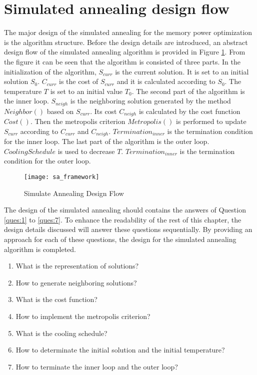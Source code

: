 	\section{Simulated annealing design flow}
	\label{sec:sa_design_flow}
	The major design of the simulated annealing for the memory power optimization is
	the algorithm structure. Before the design details are introduced, an abstract
	design flow of the simulated annealing algorithm is provided in Figure
	\ref{fig:sa_framwork}. From the figure it can be seen that the algorithm is
	consisted of three parts.
	In the initialization of the algorithm, $S_{curr}$ is
	the current solution. It is set to an initial solution $S_{0}$. $C_{curr}$ is the
	cost of $S_{curr}$ and it is calculated according to $S_{0}$. The temperature
	$T$ is set to an initial value $T_{0}$.
	The second part of the algorithm is the inner loop. $S_{neigh}$ is the neighboring
	solution generated by the method $Neighbor()$ based on $S_{curr}$. Its cost
	$C_{neigh}$ is calculated by the cost function $Cost()$. Then the metropolis
	criterion $Metropolis()$ is performed to update $S_{curr}$ according
	to $C_{curr}$ and $C_{neigh}$.
	$Termination_{inner}$ is the termination condition for the inner loop.
	The last part of the algorithm is the outer loop. $CoolingSchedule$ is used to
	decrease $T$. $Termination_{inner}$ is the termination condition for the outer loop.
	\begin{figure}[htb]
		\begin{center}
			\texttt{[image: sa\_framework]}
			\caption{Simulate Annealing Design Flow}
			\label{fig:sa_framwork}
		\end{center}
	\end{figure}	

	The design of the simulated annealing should contains the answers of Question
	\ref{ques:1} to \ref{ques:7}. To enhance the readability of the rest of this
	chapter, the design details discussed will answer these questions sequentially.
	By providing an approach for each of these questions, the design for the
	simulated annealing algorithm is completed.
	\begin{enumerate} 
		\item What is the representation of solutions?
		\label{ques:1}
		\item How to generate neighboring solutions?
		\label{ques:2}
		\item What is the cost function?
		\label{ques:3}
		\item How to implement the metropolis criterion?
		\label{ques:4}
		\item What is the cooling schedule?
		\label{ques:5}
		\item How to determinate the initial solution and the initial temperature?
		\label{ques:6}
		\item How to terminate the inner loop and the outer loop?
		\label{ques:7}
	\end{enumerate}

